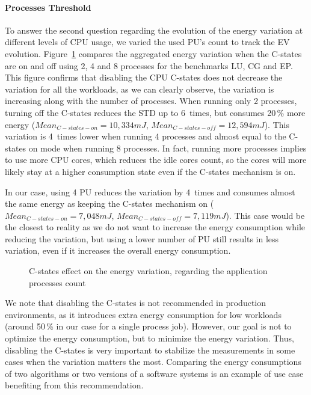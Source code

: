 \paragraph{Processes Threshold}
To answer the second question regarding the evolution of the energy variation at different levels of CPU usage, we varied the used PU's count to track the EV evolution.
Figure~\ref{fig:process-tresh} compares the aggregated energy variation when the C-states are on and off using 2, 4 and 8 processes for the benchmarks \textsf{LU}, \textsf{CG} and \textsf{EP}.
This figure confirms that disabling the CPU C-states does not decrease the variation for all the workloads, as we can clearly observe, the variation is increasing along with the number of processes.
When running only 2 processes, turning off the C-states reduces the STD up to 6~times, but consumes 20\,\% more energy ($Mean_{C-states-on}=10,334 mJ$, $Mean_{C-states-off}=12,594 mJ$).
This variation is 4~times lower when running 4 processes and almost equal to the \textsf{C-states on} mode when running 8 processes.
In fact, running more processes implies to use more CPU cores, which reduces the idle cores count, so the cores will more likely stay at a higher consumption state even if the C-states mechanism is on.

In our case, using 4 PU reduces the variation by 4~times and consumes almost the same energy as keeping the C-states mechanism on ($Mean_{C-states-on}=7,048 mJ$, $Mean_{C-states-off}=7,119 mJ$).
This case would be the closest to reality as we do not want to increase the energy consumption while reducing the variation, but using a lower number of PU still results in less variation, even if it increases the overall energy consumption.

\begin{figure}
    \caption{C-states effect on the energy variation, regarding the application processes count}\label{fig:process-tresh}
\end{figure}

We note that disabling the C-states is not recommended in production environments, as it introduces extra energy consumption for low workloads (around 50\,\% in our case for a single process job).
However, our goal is not to optimize the energy consumption, but to minimize the energy variation.
Thus, disabling the C-states is very important to stabilize the measurements in some cases when the variation matters the most.
Comparing the energy consumptions of two algorithms or two versions of a software systems is an example of use case benefiting from this recommendation.

